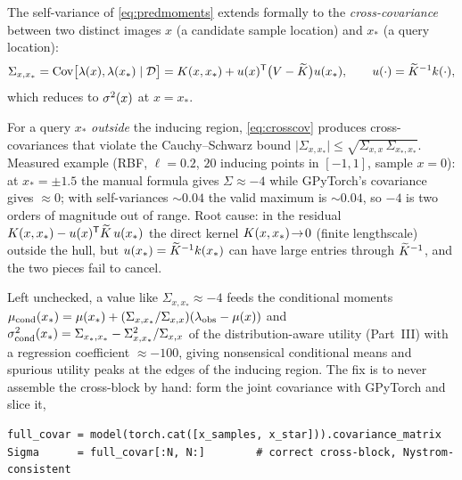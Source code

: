 The self-variance of \eqref{eq:predmoments} extends formally to the
\emph{cross-covariance} between two distinct images $x$ (a candidate sample
location) and $x_\ast$ (a query location):
\begin{equation}
  \Sigma_{x,x_\ast}=\operatorname{Cov}\!\big[\lambda(x),\lambda(x_\ast)\mid \mathcal D\big]
    =K(x,x_\ast)+u(x)^{\mathsf{T}}\big(V-\widetilde{K}\big)u(x_\ast),
  \qquad u(\cdot)=\widetilde{K}^{-1}k(\cdot),
  \label{eq:crosscov}
\end{equation}
which reduces to $\sigma^{2}(x)$ at $x=x_\ast$.

\begin{remark}
For a query $x_\ast$ \emph{outside} the inducing region, \eqref{eq:crosscov}
produces cross-covariances that violate the Cauchy--Schwarz bound
$\lvert\Sigma_{x,x_\ast}\rvert\le\sqrt{\Sigma_{x,x}\,\Sigma_{x_\ast,x_\ast}}$.
Measured example (RBF, $\ell=0.2$, $20$ inducing points in $[-1,1]$, sample
$x=0$): at $x_\ast=\pm1.5$ the manual formula gives $\Sigma\approx-4$ while
GPyTorch's covariance gives $\approx 0$; with self-variances $\sim0.04$ the valid
maximum is $\sim0.04$, so $-4$ is two orders of magnitude out of range. Root
cause: in the residual $K(x,x_\ast)-u(x)^{\mathsf{T}}\widetilde{K}\,u(x_\ast)$ the
direct kernel $K(x,x_\ast)\!\to\!0$ (finite lengthscale) outside the hull, but
$u(x_\ast)=\widetilde{K}^{-1}k(x_\ast)$ can have large entries through $\widetilde{K}^{-1}$,
and the two pieces fail to cancel.
\end{remark}

Left unchecked, a value like $\Sigma_{x,x_\ast}\approx-4$ feeds the conditional
moments
$\mu_{\mathrm{cond}}(x_\ast)=\mu(x_\ast)+(\Sigma_{x,x_\ast}/\Sigma_{x,x})(\lambda_{\mathrm{obs}}-\mu(x))$
and $\sigma^{2}_{\mathrm{cond}}(x_\ast)=\Sigma_{x_\ast,x_\ast}-\Sigma_{x,x_\ast}^2/\Sigma_{x,x}$
of the distribution-aware utility (Part~III) with a regression coefficient
$\approx-100$, giving nonsensical conditional means and spurious utility peaks at
the edges of the inducing region. The fix is to never assemble the cross-block by
hand: form the joint covariance with GPyTorch and slice it,
\begin{lstlisting}
full_covar = model(torch.cat([x_samples, x_star])).covariance_matrix
Sigma      = full_covar[:N, N:]        # correct cross-block, Nystrom-consistent
\end{lstlisting}



